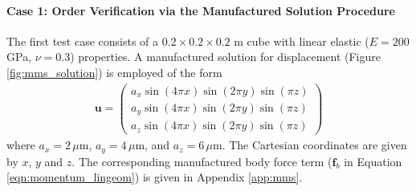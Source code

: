 \documentclass[sn-mathphys,Numbered]{sn-jnl}%
\newcommand{\bb}{\boldsymbol}
\begin{document}
\paragraph{Case 1: Order Verification via the Manufactured Solution Procedure}
The first test case consists of a $0.2 \times 0.2 \times 0.2$ m cube with linear elastic ($E = 200$ GPa, $\nu = 0.3$) properties.
A manufactured solution for displacement (Figure \ref{fig:mms_solution}) is employed of the form \citep{Mazzanti2024}
\begin{eqnarray}
	\bb{u} =
	\begin{pmatrix}
	a_x \sin(4\pi x) \sin(2\pi y) \sin(\pi z) \\
	a_y \sin(4 \pi x) \sin(2 \pi y) \sin(\pi z) \\
	a_z \sin(4 \pi x) \sin(2 \pi y) \sin(\pi z) 
	\end{pmatrix}
\end{eqnarray}
where $a_x = 2\,\mu$m, $a_y = 4\,\mu$m, and $a_z = 6\,\mu$m.
The Cartesian coordinates are given by $x$, $y$ and $z$.
The corresponding manufactured body force term ($\bb{f}_b$  in Equation \ref{eqn:momentum_lingeom}) is given in Appendix \ref{app:mms}.
\end{document}
